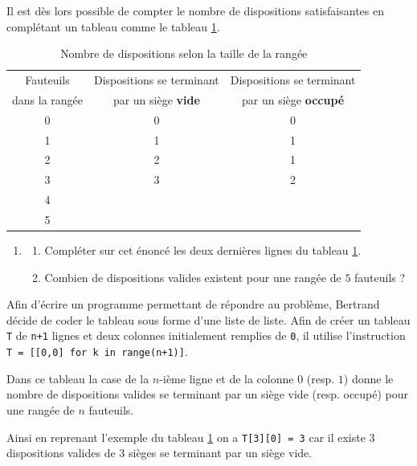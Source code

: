 \documentclass[a4paper, 11pt]{article}
\begin{document}
\par Il est dès lors possible de compter le nombre de dispositions satisfaisantes en complétant un tableau comme le tableau \ref{table:dispositions}.

\begin{table}[!ht]
	\begin{center}
		\begin{tabular}{|c|c|c|}
			\toprule
			Fauteuils & Dispositions se terminant & Dispositions se terminant \\
			dans la rangée  & par un siège \textbf{vide} & par un siège \textbf{occupé}\\
			\midrule
			0 & 0 & 0 \\
			1 & 1 & 1 \\
			2 & 2 & 1 \\
			3 & 3 & 2 \\
			\midrule
			4 &   &   \\
			\midrule
			5 &   &   \\
			\bottomrule
		\end{tabular}
		\caption{Nombre de dispositions selon la taille de la rangée}
		\label{table:dispositions}
	\end{center}
\end{table}

\begin{enumerate}
	\item \begin{enumerate}
			\item Compléter sur cet énoncé les deux dernières lignes du tableau \ref{table:dispositions}.
			\item Combien de dispositions valides existent pour une rangée de $5$ fauteuils ?
	\end{enumerate}
\end{enumerate}

Afin d'écrire un programme permettant de répondre au problème, Bertrand décide de coder le tableau sous forme d'une liste de liste.
Afin de créer un tableau \texttt{T} de \texttt{n+1} lignes et deux colonnes initialement remplies de \texttt{0}, 
il utilise l'instruction \texttt{T = [[0,0] for k in range(n+1)]}.

Dans ce tableau la case de la $n$-ième ligne et de la colonne $0$ (resp. $1$) donne le nombre de dispositions valides se terminant par un siège vide (resp. occupé) pour une rangée de $n$ fauteuils.

Ainsi en reprenant l'exemple du tableau \ref{table:dispositions} on a \texttt{T[3][0] = 3} car il existe $3$ dispositions valides de $3$ sièges se terminant par un siège vide.
\end{document}
